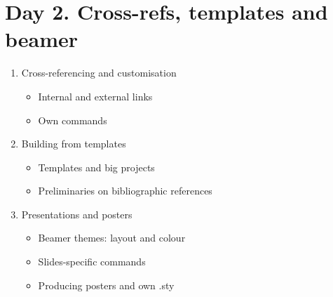 \documentclass[a4paper,12pt]{article} %
\begin{document}
\section*{Day 2. Cross-refs, templates and beamer}
\begin{enumerate}
	\item Cross-referencing and customisation 
		\begin{itemize}
			\item Internal and external links
			\item Own commands
		\end{itemize}
	\item Building from templates
		\begin{itemize}
			\item Templates and big projects
			\item Preliminaries on bibliographic references
		\end{itemize}
	\item Presentations and posters 
		\begin{itemize}
			\item Beamer themes: layout and colour
			\item Slides-specific commands
			\item Producing posters and own .sty 
		\end{itemize}
\end{enumerate}
	
\end{document}
